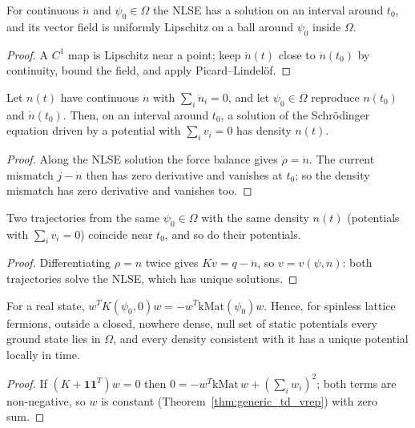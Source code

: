 \begin{theorem}
  \label{thm:exists_local}
  \leanok
  For continuous $\ddot n$ and $\psi_0\in\Omega$ the NLSE has a solution on an interval around $t_0$, and its
  vector field is uniformly Lipschitz on a ball around $\psi_0$ inside $\Omega$.
\end{theorem}
\begin{proof}
  \leanok
  A $C^1$ map is Lipschitz near a point; keep $\ddot n(t)$ close to $\ddot n(t_0)$ by continuity, bound the field,
  and apply Picard--Lindel\"of.
\end{proof}

\begin{theorem}
  \label{thm:td_existence}
  \leanok
  Let $n(t)$ have continuous $\ddot n$ with $\sum_i\ddot n_i=0$, and let $\psi_0\in\Omega$ reproduce $n(t_0)$ and
  $\dot n(t_0)$. Then, on an interval around $t_0$, a solution of the Schr\"odinger equation driven by a potential
  with $\sum_iv_i=0$ has density $n(t)$.
\end{theorem}
\begin{proof}
  \leanok
  Along the NLSE solution the force balance gives $\ddot\rho=\ddot n$. The current mismatch $j-\dot n$ then has zero
  derivative and vanishes at $t_0$; so the density mismatch has zero derivative and vanishes too.
\end{proof}

\begin{theorem}
  \label{thm:td_uniqueness}
  \leanok
  Two trajectories from the same $\psi_0\in\Omega$ with the same density $n(t)$ (potentials with
  $\sum_iv_i=0$) coincide near $t_0$, and so do their potentials.
\end{theorem}
\begin{proof}
  \leanok
  Differentiating $\rho=n$ twice gives $Kv=q-\ddot n$, so $v=v(\psi,\ddot n)$: both trajectories solve the NLSE,
  which has unique solutions.
\end{proof}

\begin{theorem}
  \label{thm:generic_ground_mem_omega}
  \leanok
  For a real state, $w^TK(\psi_0,0)w=-w^T\mathrm{kMat}(\psi_0)w$. Hence, for spinless lattice fermions,
  outside a closed, nowhere dense, null set of static potentials every ground state lies in $\Omega$, and
  every density consistent with it has a unique potential locally in time.
\end{theorem}
\begin{proof}
  \leanok
  If $(K+\mathbf 1\mathbf 1^T)w=0$ then $0=-w^T\mathrm{kMat}\,w+(\sum_iw_i)^2$; both terms are non-negative, so
  $w$ is constant (Theorem~\ref{thm:generic_td_vrep}) with zero sum.
\end{proof}


